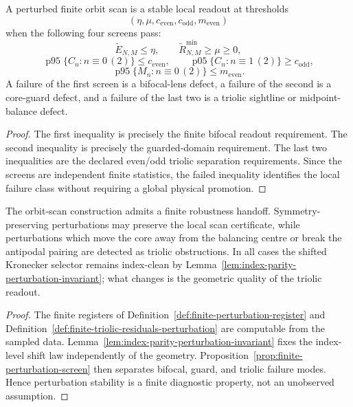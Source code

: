\begin{proposition}
\label{prop:finite-perturbation-screen}
A perturbed finite orbit scan is a stable local readout at thresholds
\[
(\eta,\mu,c_{\mathrm{even}},c_{\mathrm{odd}},m_{\mathrm{even}})
\]
when the following four screens pass:
\[
\widetilde E_{N,M}\leq\eta,
\qquad
\widetilde R_{N,M}^{\min}\geq\mu\geq0,
\]
\[
\operatorname{p95}\{C_n:n\equiv0\,(2)\}\leq c_{\mathrm{even}},
\qquad
\operatorname{p05}\{C_n:n\equiv1\,(2)\}\geq c_{\mathrm{odd}},
\]
\[
\operatorname{p95}\{M_n:n\equiv0\,(2)\}\leq m_{\mathrm{even}}.
\]
A failure of the first screen is a bifocal-lens defect, a failure of the second is a core-guard defect, and a failure of the last two is a triolic sightline or midpoint-balance defect.
\end{proposition}

\begin{proof}
The first inequality is precisely the finite bifocal readout requirement.  The second inequality is precisely the guarded-domain requirement.  The last two inequalities are the declared even/odd triolic separation requirements.  Since the screens are independent finite statistics, the failed inequality identifies the local failure class without requiring a global physical promotion.
\end{proof}

\begin{theorem}
\label{thm:finite-robustness-handoff}
The orbit-scan construction admits a finite robustness handoff.  Symmetry-preserving perturbations may preserve the local scan certificate, while perturbations which move the core away from the balancing centre or break the antipodal pairing are detected as triolic obstructions.  In all cases the shifted Kronecker selector remains index-clean by Lemma~\ref{lem:index-parity-perturbation-invariant}; what changes is the geometric quality of the triolic readout.
\end{theorem}

\begin{proof}
The finite registers of Definition~\ref{def:finite-perturbation-register} and Definition~\ref{def:finite-triolic-residuals-perturbation} are computable from the sampled data.  Lemma~\ref{lem:index-parity-perturbation-invariant} fixes the index-level shift law independently of the geometry.  Proposition~\ref{prop:finite-perturbation-screen} then separates bifocal, guard, and triolic failure modes.  Hence perturbation stability is a finite diagnostic property, not an unobserved assumption.
\end{proof}

